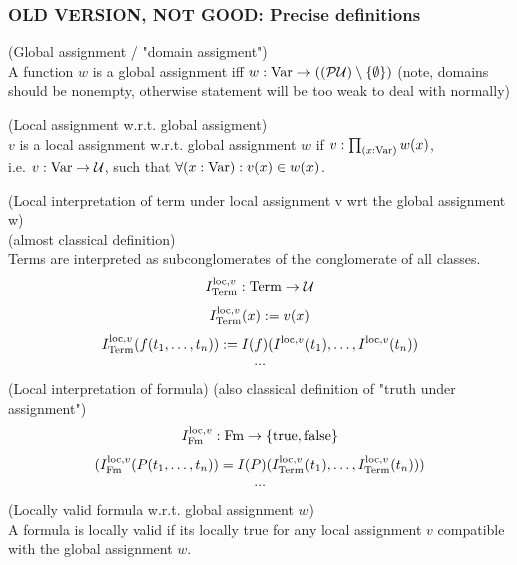 \subsubsection{OLD VERSION, NOT GOOD: Precise definitions}
\begin{definition}(Global assignment / "domain assigment")\\
A function $w$ is a global assignment iff
$w:\mathrm{Var}\to((\mathcal{P}\mathcal{U})\setminus\{\emptyset\})$
(note, domains should be nonempty, otherwise statement will be too weak to deal with normally)
\end{definition}
\begin{definition}(Local assignment w.r.t. global assigment)\\
$v$ is a local assignment w.r.t. global assignment $w$ if $v:\prod_{(x:\mathrm{Var})}w(x)$,\\
i.e. $v:\mathrm{Var}\to\mathcal{U}$, such that $\forall (x:\mathrm{Var}) : v(x) \in w(x)$.\\
\end{definition}
\begin{definition}(Local interpretation of term under local assignment v wrt the global assignment w)\\
(almost classical definition)\\%
Terms are interpreted as subconglomerates of the conglomerate of all classes.
\[
I^{\mathrm{loc},v}_{\mathrm{Term}} : \mathrm{Term} \to \mathcal{U}
\]
\[
I^{\mathrm{loc},v}_{\mathrm{Term}}(x) := v(x)
\]
\[
I^{\mathrm{loc},v}_{\mathrm{Term}}(f(t_1,\dots,t_n)) := I(f)(I^{\mathrm{loc},v}(t_1),\dots,I^{\mathrm{loc},v}(t_n))
\]
\[
\dots
\]
\end{definition}
\begin{definition}(Local interpretation of formula)
(also classical definition of "truth under assignment")
\[
I^{\mathrm{loc},v}_{\mathrm{Fm}} : \mathrm{Fm} \to \{\mathrm{true}, \mathrm{false}\}
\]
\[
(I^{\mathrm{loc},v}_{\mathrm{Fm}}(P(t_1,\dots,t_n))=I(P)(I^{\mathrm{loc},v}_{\mathrm{Term}}(t_1),\dots,I^{\mathrm{loc},v}_{\mathrm{Term}}(t_n)))
\]
\[
\dots
\]

\end{definition}
\begin{definition}(Locally valid formula w.r.t. global assignment $w$)\\
A formula is locally valid if its locally true for any local assignment $v$ compatible with the global assignment $w$.
\end{definition}
